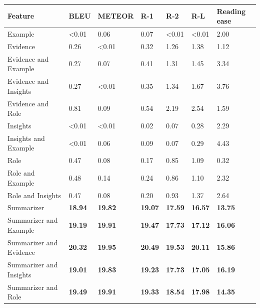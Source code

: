\begin{tabular}{|l|l|l|l|l|l|l|}
\hline
\textbf{Feature} & BLEU & METEOR & R-1 & R-2 & R-L & Reading ease \\
 \hline
 Example & \textless{}0.01 & 0.06 & 0.07 & \textless{}0.01 & \textless{}0.01 & 2.00 \\
 \hline
 Evidence & 0.26 & \textless{}0.01 & 0.32 & 1.26 & 1.38 & 1.12 \\
 \hline
 Evidence and Example & 0.27 & 0.07 & 0.41 & 1.31 & 1.45 & 3.34 \\
 \hline
 Evidence and Insights & 0.27 & \textless{}0.01 & 0.35 & 1.34 & 1.67 & 3.76 \\
 \hline
 Evidence and Role & 0.81 & 0.09 & 0.54 & 2.19 & 2.54 & 1.59 \\
 \hline
 Insights & \textless{}0.01 & \textless{}0.01 & 0.02 & 0.07 & 0.28 & 2.29 \\
 \hline
 Insights and Example & \textless{}0.01 & 0.06 & 0.09 & 0.07 & 0.29 & 4.43 \\
 \hline
 Role & 0.47 & 0.08 & 0.17 & 0.85 & 1.09 & 0.32 \\
 \hline
 Role and Example & 0.48 & 0.14 & 0.24 & 0.86 & 1.10 & 2.32 \\
 \hline
 Role and Insights & 0.47 & 0.08 & 0.20 & 0.93 & 1.37 & 2.64 \\
 \hline
 Summarizer & \textbf{18.94} & \textbf{19.82} & \textbf{19.07} & \textbf{17.59} & \textbf{16.57} & \textbf{13.75} \\
 \hline
 Summarizer and Example & \textbf{19.19} & \textbf{19.91} & \textbf{19.47} & \textbf{17.73} & \textbf{17.12} & \textbf{16.06} \\
 \hline
 Summarizer and Evidence & \textbf{20.32} & \textbf{19.95} & \textbf{20.49} & \textbf{19.53} & \textbf{20.11} & \textbf{15.86} \\
 \hline
 Summarizer and Insights & \textbf{19.01} & \textbf{19.83} & \textbf{19.23} & \textbf{17.73} & \textbf{17.05} & \textbf{16.19} \\
 \hline
 Summarizer and Role & \textbf{19.49} & \textbf{19.91} & \textbf{19.33} & \textbf{18.54} & \textbf{17.98} & \textbf{14.35} \\
\hline
\end{tabular}
